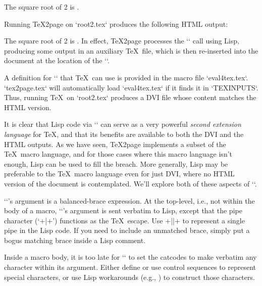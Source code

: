 {{{{{{{{{\begintt


The square root of 2 is
.

\bye
\endtt
Running \TeX2page on `root2.tex` produces
the following HTML output:

\quote
The square root of 2 is
.
\endquote
In effect, \TeX2page processes the `\eval` call
using Lisp, producing some output in an auxiliary
\TeX\ file, which is then re-inserted into the document at the location of
the `\eval`.

A definition for `\eval` that \TeX\ can use
is provided in the macro file `eval4tex.tex`.
`tex2page.tex` will automatically load `eval4tex.tex` if it finds it in
`TEXINPUTS`.
Thus, running \TeX\ on
`root2.tex` produces a DVI file whose
content matches the HTML version.


It is clear that Lisp code via `\eval` can serve as
a very powerful {\em second extension language} for
\TeX, and that its benefits are available to both the
DVI and the HTML outputs.  As we have seen, \TeX2page
implements a subset of the \TeX\ macro language, and for
those cases where this macro language isn’t enough,
Lisp can be used to fill the breach.  More generally,
Lisp may be preferable to the \TeX\ macro language even
for just DVI, where no HTML version of the document is
contemplated.  We’ll explore both of these
aspects of `\eval`.

`\eval`’s argument is a balanced-brace
expression.  At the top-level, i.e., not within the body of a macro,
`\eval`’s argument is sent verbatim to Lisp, except that the pipe character
(‘\p+|+’) functions as the \TeX\ escape.  Use \p+||+ to represent a single
pipe in the Lisp code.  If you need to include an unmatched brace, simply
put a bogus matching brace inside a Lisp comment.

Inside a macro body, it is too late for `\eval` to set the catcodes
to make verbatim any character within its argument.  Either define or
use control sequences to represent special characters, or use
Lisp
workarounds (e.g., ) to construct those characters.

}}}}}}}}}
